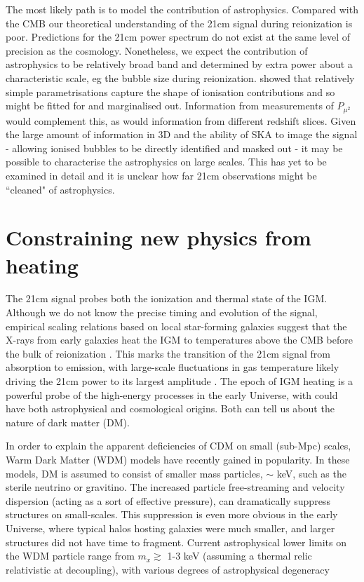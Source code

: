 \documentclass{PoS}
\begin{document}
The most likely path is to model the contribution of astrophysics. Compared with the CMB our theoretical understanding of the 21cm signal during reionization is poor. Predictions for the 21cm power spectrum do not exist at the same level of precision as the cosmology. Nonetheless, we expect the contribution of astrophysics to be relatively broad band and determined by extra power about a characteristic scale, eg the bubble size during reionization. \cite{2008PhRvD..78b3529M} showed that relatively simple parametrisations capture the shape of ionisation contributions and so might be fitted for and marginalised out. Information from measurements of $P_{\mu^2}$ would complement this, as would information from different redshift slices. Given the large amount of information in 3D and the ability of SKA to image the signal - allowing ionised bubbles to be directly identified and masked out - it may be possible to characterise the astrophysics on large scales. This has yet to be examined in detail and it is unclear how far 21cm observations might be ``cleaned" of astrophysics.

\section{Constraining new physics from heating}
\label{sec:heating}

The 21cm signal probes both the ionization and thermal state of the IGM.  Although we do not know the precise timing and evolution of the signal, empirical scaling relations based on local star-forming galaxies \cite[e.g.][]{2012MNRAS.419.2095M} suggest that the X-rays from early galaxies heat the IGM to temperatures above the CMB before the bulk of reionization \cite[e.g.][]{2006MNRAS.371..867F,2012ApJ...760....3M}.  This marks the transition of the 21cm signal from absorption to emission, with large-scale fluctuations in gas temperature likely driving the 21cm power to its largest amplitude \cite[e.g.][]{2007MNRAS.376.1680P,2010A&A...523A...4B}.  The epoch of IGM heating is a powerful probe of the high-energy processes in the early Universe, with could have both astrophysical and cosmological origins.  Both can tell us about the nature of dark matter (DM).

In order to explain the apparent deficiencies of CDM on small (sub-Mpc) scales, Warm Dark Matter (WDM) models have recently gained in popularity.  In these models, DM is assumed to consist of smaller mass particles, $\sim$ keV, such as the sterile neutrino or gravitino.  The increased particle free-streaming and velocity dispersion (acting as a sort of effective pressure), can dramatically suppress structures on small-scales.  This suppression is even more obvious in the early Universe, where typical halos hosting galaxies were much smaller, and larger structures did not have time to fragment.  Current astrophysical lower limits on the WDM particle range from $m_x \gtrsim$ 1-3 keV (assuming a thermal relic relativistic at decoupling), with various degrees of astrophysical degeneracy \cite[e.g.][]{2013MNRAS.432.3218D,2013ApJ...767...22K,2014MNRAS.443..678P,2013PhRvD..88d3502V}
\end{document}
